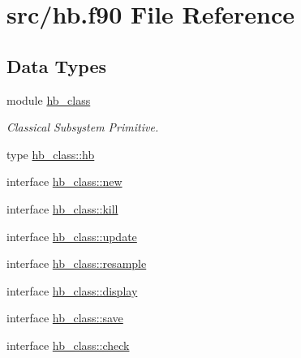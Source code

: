 \hypertarget{hb_8f90}{\section{src/hb.f90 File Reference}
\label{hb_8f90}
}
\subsection*{Data Types}
\begin{DoxyCompactItemize}
\item 
module \hyperlink{classhb__class}{hb\-\_\-class}
\begin{DoxyCompactList}\small\item\em Classical Subsystem Primitive. \end{DoxyCompactList}\item 
type \hyperlink{structhb__class_1_1hb}{hb\-\_\-class\-::hb}
\item 
interface \hyperlink{interfacehb__class_1_1new}{hb\-\_\-class\-::new}
\item 
interface \hyperlink{interfacehb__class_1_1kill}{hb\-\_\-class\-::kill}
\item 
interface \hyperlink{interfacehb__class_1_1update}{hb\-\_\-class\-::update}
\item 
interface \hyperlink{interfacehb__class_1_1resample}{hb\-\_\-class\-::resample}
\item 
interface \hyperlink{interfacehb__class_1_1display}{hb\-\_\-class\-::display}
\item 
interface \hyperlink{interfacehb__class_1_1save}{hb\-\_\-class\-::save}
\item 
interface \hyperlink{interfacehb__class_1_1check}{hb\-\_\-class\-::check}
\end{DoxyCompactItemize}
